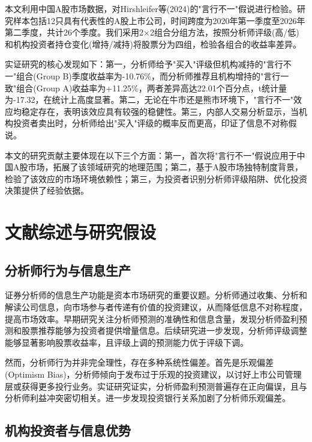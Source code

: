 \documentclass[12pt,a4paper]{article}
\begin{document}
本文利用中国A股市场数据，对Hirshleifer等(2024)的"言行不一"假说进行检验。研究样本包括12只具有代表性的A股上市公司，时间跨度为2020年第一季度至2026年第二季度，共计26个季度。我们采用2×2组合分组方法，按照分析师评级(高/低)和机构投资者持仓变化(增持/减持)将股票分为四组，检验各组合的收益率差异。

实证研究的核心发现如下：第一，分析师给予"买入"评级但机构减持的"言行不一"组合(Group B)季度收益率为-10.76\%，而分析师推荐且机构增持的"言行一致"组合(Group A)收益率为+11.25\%，两者差异高达22.01个百分点，t统计量为-17.32，在统计上高度显著。第二，无论在牛市还是熊市环境下，"言行不一"效应均稳定存在，表明该效应具有较强的稳健性。第三，内部人交易分析显示，当机构投资者卖出时，分析师给出"买入"评级的概率反而更高，印证了信息不对称假说。

本文的研究贡献主要体现在以下三个方面：第一，首次将"言行不一"假说应用于中国A股市场，拓展了该领域研究的地理范围；第二，基于A股市场独特制度背景，检验了该效应的市场环境依赖性；第三，为投资者识别分析师评级陷阱、优化投资决策提供了经验依据。

\section{文献综述与研究假设}

\subsection{分析师行为与信息生产}

证券分析师的信息生产功能是资本市场研究的重要议题。分析师通过收集、分析和解读公司信息，向市场参与者传递有价值的投资建议，从而降低信息不对称程度，提高市场效率。\cite{womack1996brokerage}早期研究关注分析师预测的准确性和信息含量，发现分析师盈利预测和股票推荐能够为投资者提供增量信息。\cite{jegadeesh2004analyst}后续研究进一步发现，分析师评级调整能够显著影响股票收益率，且评级上调的预测能力优于评级下调。

然而，分析师行为并非完全理性，存在多种系统性偏差。首先是乐观偏差(Optimism Bias)，分析师倾向于发布过于乐观的投资建议，以讨好上市公司管理层或获得更多投行业务。\cite{lin2005analyst}实证研究证实，分析师盈利预测普遍存在正向偏误，且与分析师利益冲突密切相关。\cite{degeorge2013investment}进一步发现投资银行关系加剧了分析师乐观偏差。

\subsection{机构投资者与信息优势}
\end{document}
